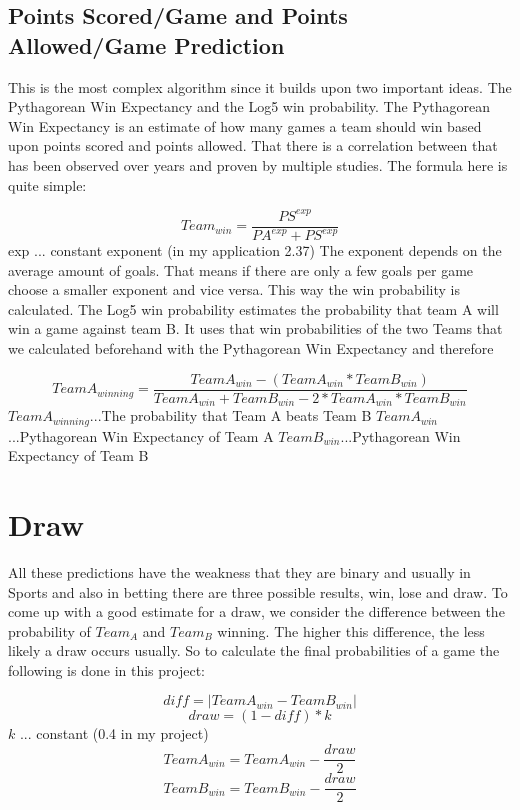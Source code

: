 \documentclass{article}
\begin{document}
\subsection{Points Scored/Game and Points Allowed/Game Prediction}
This is the most complex algorithm since it builds upon two important ideas. The Pythagorean Win Expectancy and the Log5 win probability. The Pythagorean Win Expectancy is an estimate of how many games a team should win based upon points scored and points allowed. That there is a correlation between that has been observed over years and proven by multiple studies. The formula here is quite simple:

$$Team_{win} = \frac{PS^{exp}}{PA^{exp} + PS^{exp}}$$ \newline
exp ... constant exponent (in my application 2.37) \newline
The exponent depends on the average amount of goals. That means if there are only a few goals per game choose a smaller exponent and vice versa. This way the win probability is calculated. The Log5 win probability estimates the probability that team A will win a game against team B. It uses that win probabilities of the two Teams that we calculated beforehand with the Pythagorean Win Expectancy and therefore \newline

$$TeamA_{winning} = \frac{TeamA_{win} - (TeamA_{win} * TeamB_{win})}{TeamA_{win} + TeamB_{win} - 2* TeamA_{win} * TeamB_{win}}$$
$TeamA_{winning}$...The probability that Team A beats Team B \newline
$TeamA_{win}$...Pythagorean Win Expectancy of Team A \newline
$TeamB_{win}$...Pythagorean Win Expectancy of Team B

\section{Draw}
All these predictions have the weakness that they are binary and usually in Sports and also in betting there are three possible results, win, lose and draw. To come up with a good estimate for a draw, we consider the difference between the probability of $Team_A$ and $Team_B$ winning. The higher this difference, the less likely a draw occurs usually. So to calculate the final probabilities of a game the following is done in this project:

$$ diff = | TeamA_{win} - TeamB_{win} | $$
$$draw = (1 - diff) * k$$ 
$k$ ... constant (0.4 in my project) \newline
$$TeamA_{win} = TeamA_{win} - \frac{draw}{2}$$ 
$$TeamB_{win} = TeamB_{win} - \frac{draw}{2}$$
\end{document}
